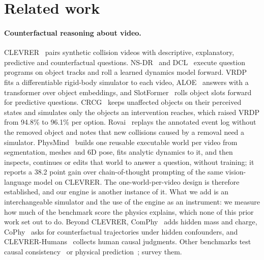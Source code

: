 \IfFileExists{TMLR}{\documentclass[10pt]{article}}%
\providecommand{\etal}{et al.}
\newcommand{\namecite}[2]{\citet{#2}}
\newcommand{\namecite}[2]{#1 \etal~\oldcitecompat{#2}}
\newcommand{\oldcitecompat}[1]{\cite{#1}}
\begin{document}
\section{Related work}
\label{sec:related}

\paragraph{Counterfactual reasoning about video.}
CLEVRER~\cite{yi2020clevrer} pairs synthetic collision videos with descriptive, explanatory, predictive and counterfactual questions.
NS-DR~\cite{yi2020clevrer} and DCL~\cite{chen2021dcl} execute question programs on object tracks and roll a learned dynamics model forward.
VRDP~\cite{ding2021vrdp} fits a differentiable rigid-body simulator to each video, ALOE~\cite{ding2021aloe} answers with a transformer over object embeddings, and SlotFormer~\cite{wu2023slotformer} rolls object slots forward for predictive questions.
CRCG~\cite{ishay2024crcg} keeps unaffected objects on their perceived states and simulates only the objects an intervention reaches, which raised VRDP from 94.8\% to 96.1\% per option.
Rovai~\cite{rovai2026eventgraph} replays the annotated event log without the removed object and notes that new collisions caused by a removal need a simulator.
PhysMind~\cite{yang2026physmind} builds one reusable executable world per video from segmentation, meshes and 6D pose, fits analytic dynamics to it, and then inspects, continues or edits that world to answer a question, without training; it reports a 38.2 point gain over chain-of-thought prompting of the same vision-language model on CLEVRER.
The one-world-per-video design is therefore established, and our engine is another instance of it.
What we add is an interchangeable simulator and the use of the engine as an instrument: we measure how much of the benchmark score the physics explains, which none of this prior work set out to do.
Beyond CLEVRER, ComPhy~\cite{chen2022comphy} adds hidden mass and charge, CoPhy~\cite{baradel2020cophy,janny2022filtered} asks for counterfactual trajectories under hidden confounders, and CLEVRER-Humans~\cite{mao2022clevrerhumans} collects human causal judgments.
Other benchmarks test causal consistency~\cite{ates2022craft,foss2025causalvqa,begiristain2026cronos} or physical prediction~\cite{bear2021physion,tung2023physionpp,bordes2025intphys2}; \namecite{Melnik}{melnik2023benchmarks} survey them.
\end{document}
